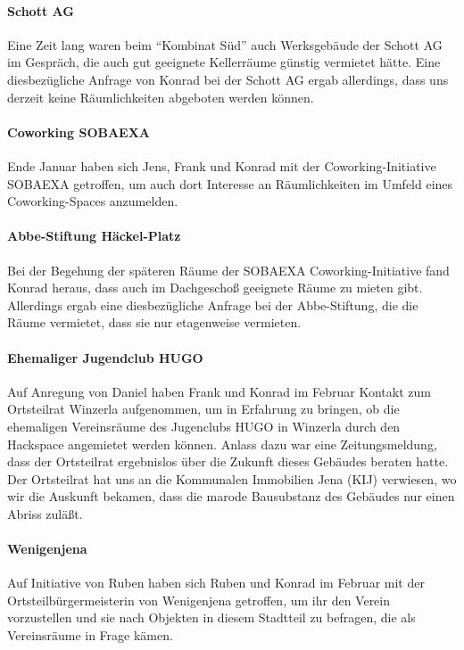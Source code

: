 \documentclass[10pt,DIV16]{scrartcl}
\begin{document}
\paragraph{Schott AG}

Eine Zeit lang waren beim "`Kombinat Süd"' auch Werksgebäude der Schott AG im
Gespräch, die auch gut geeignete Kellerräume günstig vermietet hätte.  Eine
diesbezügliche Anfrage von Konrad bei der Schott AG ergab allerdings, dass uns
derzeit keine Räumlichkeiten abgeboten werden können.

\paragraph{Coworking SOBAEXA}

Ende Januar haben sich Jens, Frank und Konrad mit der Coworking-Initiative
SOBAEXA getroffen, um auch dort Interesse an Räumlichkeiten im Umfeld eines
Coworking-Spaces anzumelden.

\paragraph{Abbe-Stiftung Häckel-Platz}

Bei der Begehung der späteren Räume der SOBAEXA Coworking-Initiative fand
Konrad heraus, dass auch im Dachgeschoß geeignete Räume zu mieten gibt.
Allerdings ergab eine diesbezügliche Anfrage bei der Abbe-Stiftung, die die
Räume vermietet, dass sie nur etagenweise vermieten.

\paragraph{Ehemaliger Jugendclub HUGO}

Auf Anregung von Daniel haben Frank und Konrad im Februar Kontakt zum
Ortsteilrat Winzerla aufgenommen, um in Erfahrung zu bringen, ob die
ehemaligen Vereinsräume des Jugenclubs HUGO in Winzerla durch den Hackspace
angemietet werden können.  Anlass dazu war eine Zeitungsmeldung, dass der
Ortsteilrat ergebnislos über die Zukunft dieses Gebäudes beraten hatte.  Der
Ortsteilrat hat uns an die Kommunalen Immobilien Jena (KIJ) verwiesen, wo wir
die Auskunft bekamen, dass die marode Bausubstanz des Gebäudes nur einen
Abriss zuläßt.

\paragraph{Wenigenjena}

Auf Initiative von Ruben haben sich Ruben und Konrad im Februar mit der
Orts\-teil\-bür\-ger\-meis\-te\-rin von Wenigenjena getroffen, um ihr den
Verein vorzustellen und sie nach Objekten in diesem Stadtteil zu befragen, die
als Vereinsräume in Frage kämen.
\end{document}

